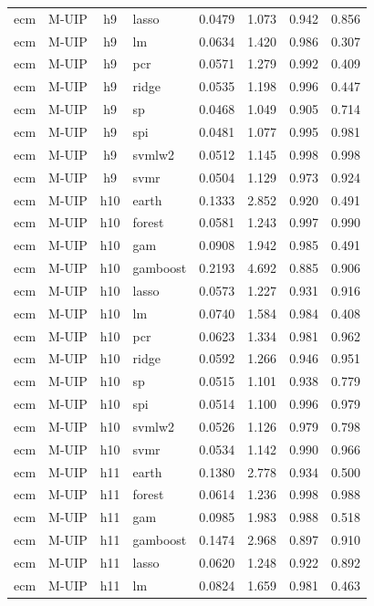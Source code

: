 \begin{ThreePartTable}
\begin{longtable}[t]{llclcccc}
ecm & M-UIP & h9 & lasso & 0.0479 & 1.073 & 0.942 & 0.856\\
ecm & M-UIP & h9 & lm & 0.0634 & 1.420 & 0.986 & 0.307\\
ecm & M-UIP & h9 & pcr & 0.0571 & 1.279 & 0.992 & 0.409\\
ecm & M-UIP & h9 & ridge & 0.0535 & 1.198 & 0.996 & 0.447\\
ecm & M-UIP & h9 & sp & 0.0468 & 1.049 & 0.905 & 0.714\\
ecm & M-UIP & h9 & spi & 0.0481 & 1.077 & 0.995 & 0.981\\
ecm & M-UIP & h9 & svmlw2 & 0.0512 & 1.145 & 0.998 & 0.998\\
ecm & M-UIP & h9 & svmr & 0.0504 & 1.129 & 0.973 & 0.924\\
\addlinespace
ecm & M-UIP & h10 & earth & 0.1333 & 2.852 & 0.920 & 0.491\\
ecm & M-UIP & h10 & forest & 0.0581 & 1.243 & 0.997 & 0.990\\
ecm & M-UIP & h10 & gam & 0.0908 & 1.942 & 0.985 & 0.491\\
ecm & M-UIP & h10 & gamboost & 0.2193 & 4.692 & 0.885 & 0.906\\
ecm & M-UIP & h10 & lasso & 0.0573 & 1.227 & 0.931 & 0.916\\
ecm & M-UIP & h10 & lm & 0.0740 & 1.584 & 0.984 & 0.408\\
ecm & M-UIP & h10 & pcr & 0.0623 & 1.334 & 0.981 & 0.962\\
ecm & M-UIP & h10 & ridge & 0.0592 & 1.266 & 0.946 & 0.951\\
ecm & M-UIP & h10 & sp & 0.0515 & 1.101 & 0.938 & 0.779\\
ecm & M-UIP & h10 & spi & 0.0514 & 1.100 & 0.996 & 0.979\\
ecm & M-UIP & h10 & svmlw2 & 0.0526 & 1.126 & 0.979 & 0.798\\
ecm & M-UIP & h10 & svmr & 0.0534 & 1.142 & 0.990 & 0.966\\
\addlinespace
ecm & M-UIP & h11 & earth & 0.1380 & 2.778 & 0.934 & 0.500\\
ecm & M-UIP & h11 & forest & 0.0614 & 1.236 & 0.998 & 0.988\\
ecm & M-UIP & h11 & gam & 0.0985 & 1.983 & 0.988 & 0.518\\
ecm & M-UIP & h11 & gamboost & 0.1474 & 2.968 & 0.897 & 0.910\\
ecm & M-UIP & h11 & lasso & 0.0620 & 1.248 & 0.922 & 0.892\\
ecm & M-UIP & h11 & lm & 0.0824 & 1.659 & 0.981 & 0.463\\

\end{longtable}
\end{ThreePartTable}
